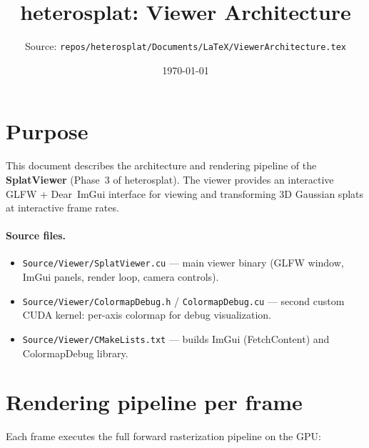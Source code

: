\documentclass[11pt]{article}
\title{heterosplat: Viewer Architecture}
\author{Source: \texttt{repos/heterosplat/Documents/LaTeX/ViewerArchitecture.tex}}
\date{\today}
\begin{document}
\maketitle

\section{Purpose}

This document describes the architecture and rendering pipeline of the
\textbf{SplatViewer} (Phase~3 of heterosplat). The viewer provides an
interactive GLFW + Dear~ImGui interface for viewing and transforming
3D Gaussian splats at interactive frame rates.

\paragraph{Source files.}
\begin{itemize}
  \item \texttt{Source/Viewer/SplatViewer.cu} --- main viewer binary (GLFW
        window, ImGui panels, render loop, camera controls).
  \item \texttt{Source/Viewer/ColormapDebug.h} / \texttt{ColormapDebug.cu} ---
        second custom CUDA kernel: per-axis colormap for debug visualization.
  \item \texttt{Source/Viewer/CMakeLists.txt} --- builds ImGui (FetchContent)
        and ColormapDebug library.
\end{itemize}

\section{Rendering pipeline per frame}

Each frame executes the full forward rasterization pipeline on the GPU:
\end{document}
